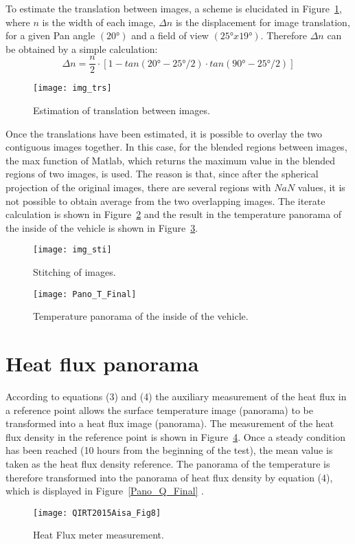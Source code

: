 \documentclass{tQRT2e}
\begin{document}
To estimate the translation between images, a scheme is elucidated in Figure~\ref{Trans}, where $ n $ is the width of each image, $ \Delta n $ is the displacement for image translation, for a given Pan angle $ (20°) $ and a field of view $ (25°x19°) $. Therefore $ \Delta n $ can be obtained by a simple calculation:
\begin{equation}
\Delta n=\dfrac{n}{2}⋅[1-tan(20°-25°/2)\cdot tan(90°-25°/2)]
\end{equation}

\begin{figure}[ht]
	\centering
	\texttt{[image: img\_trs]}
	\caption{ Estimation of translation between images.}
	\label{Trans}
\end{figure}

Once the translations have been estimated, it is possible to overlay the two contiguous images together. In this case, for the blended regions between images, the max function of Matlab, which returns the maximum value in the blended regions of two images, is used. The reason is that, since after the spherical projection of the original images, there are several regions with $ NaN $ values, it is not possible to obtain average from the two overlapping images. The iterate calculation is shown in Figure~\ref{img_sti} and the result in the temperature panorama of the inside of the vehicle is shown in Figure~\ref{Pano_T_Final}.
\begin{figure}[ht]
	\centering
	\texttt{[image: img\_sti]}
	\caption{Stitching of images.}
	\label{img_sti}
\end{figure}

\begin{figure}[ht]
	\hspace*{-20pt}
	\texttt{[image: Pano\_T\_Final]}
	\caption{Temperature panorama of the inside of the vehicle.}
	\label{Pano_T_Final}
\end{figure}

\section{Heat flux panorama}
According to equations (3) and (4) the auxiliary measurement of the heat flux in a reference point allows the surface temperature image (panorama) to be transformed into a heat flux image (panorama). The measurement of the heat flux density in the reference point is shown in Figure~\ref{Flux_meter}. Once a steady condition has been reached (10 hours from the beginning of the test), the mean value is taken as the heat flux density reference. The panorama of the temperature is therefore transformed into the panorama of heat flux density by equation (4), which is displayed in Figure~\ref{Pano_Q_Final} . 
\begin{figure}[ht]
	\centering
	\texttt{[image: QIRT2015Aisa\_Fig8]}
	\caption{Heat Flux meter measurement.}
	\label{Flux_meter}
\end{figure}
\end{document}
